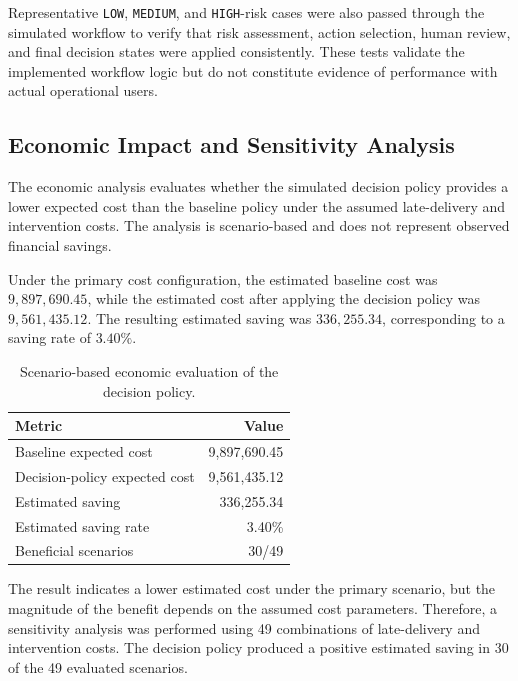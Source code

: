 \documentclass[10pt,a4paper]{article}
\providecommand{\Description}[1]{}
\begin{document}
Representative \texttt{LOW}, \texttt{MEDIUM}, and \texttt{HIGH}-risk
cases were also passed through the simulated workflow to verify that
risk assessment, action selection, human review, and final decision
states were applied consistently. These tests validate the implemented
workflow logic but do not constitute evidence of performance with
actual operational users.

\subsection{Economic Impact and Sensitivity Analysis}

The economic analysis evaluates whether the simulated decision policy
provides a lower expected cost than the baseline policy under the
assumed late-delivery and intervention costs. The analysis is
scenario-based and does not represent observed financial savings.

Under the primary cost configuration, the estimated baseline cost was
$9{,}897{,}690.45$, while the estimated cost after applying the decision
policy was $9{,}561{,}435.12$. The resulting estimated saving was
$336{,}255.34$, corresponding to a saving rate of $3.40\%$.

\begin{table}[htbp]
\centering
\caption{Scenario-based economic evaluation of the decision policy.}
\Description{Table summarizing the scenario-based economic evaluation of the decision policy, listing baseline and decision-policy expected costs, estimated savings, saving rate, and the number of beneficial scenarios.}
\label{tab:economic_impact}
\small
\begin{tabular}{lr}
\toprule
Metric & Value \\
\midrule
Baseline expected cost & 9{,}897{,}690.45 \\
Decision-policy expected cost & 9{,}561{,}435.12 \\
Estimated saving & 336{,}255.34 \\
Estimated saving rate & 3.40\% \\
Beneficial scenarios & 30/49 \\
\bottomrule
\end{tabular}
\end{table}

The result indicates a lower estimated cost under the primary scenario,
but the magnitude of the benefit depends on the assumed cost parameters.
Therefore, a sensitivity analysis was performed using 49 combinations
of late-delivery and intervention costs. The decision policy produced a
positive estimated saving in 30 of the 49 evaluated scenarios.
\end{document}
